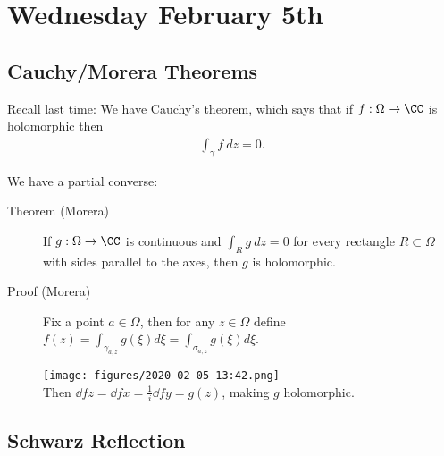\hypertarget{wednesday-february-5th}{%
\section{Wednesday February 5th}\label{wednesday-february-5th}}

\hypertarget{cauchymorera-theorems}{%
\subsection{Cauchy/Morera Theorems}\label{cauchymorera-theorems}}

Recall last time: We have Cauchy's theorem, which says that if
\(f: \Omega \to \CC\) is holomorphic then
\begin{align*}\int_\gamma f~dz = 0.\end{align*}

We have a partial converse:

\begin{description}
\item[Theorem (Morera)]
If \(g: \Omega \to \CC\) is continuous and \(\int_R g~dz = 0\) for every
rectangle \(R\subset \Omega\) with sides parallel to the axes, then
\(g\) is holomorphic.
\item[Proof (Morera)]
Fix a point \(a\in\Omega\), then for any \(z\in\Omega\) define
\(f(z) = \int_{\gamma_{a, z}} g(\xi) d\xi = \int_{\sigma_{a, z}} g(\xi) d\xi\).

\texttt{[image: figures/2020-02-05-13:42.png]}\\

Then \(\dd{f}{z} = \dd{f}{x} = \frac 1 i \dd{f}{y} = g(z)\), making
\(g\) holomorphic.
\end{description}

\hypertarget{schwarz-reflection}{%
\subsection{Schwarz Reflection}\label{schwarz-reflection}}

